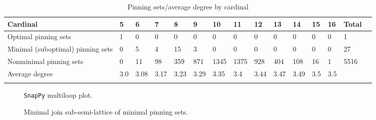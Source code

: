 \documentclass{article}%
\begin{document}
\begin{table}[ht]
	\caption{Pinning sets/average degree by cardinal}
	\centering
	\renewcommand{\arraystretch}{1.5}
	\begin{tabularx}{\textwidth}{lXXXXXXXXXXXXXX}
		\toprule
			Cardinal & 5 & 6 & 7 & 8 & 9 & 10 & 11 & 12 & 13 & 14 & 15 & 16 & Total\\
			\hline
			Optimal pinning sets & 1 & 0 & 0 & 0 & 0 & 0 & 0 & 0 & 0 & 0 & 0 & 0 & 1 \\
			Minimal (suboptimal) pinning sets & 0 & 5 & 4 & 15 & 3 & 0 & 0 & 0 & 0 & 0 & 0 & 0 & 27 \\
			Nonminimal pinning sets & 0 & 11 & 98 & 359 & 871 & 1345 & 1375 & 928 & 404 & 108 & 16 & 1 & 5516 \\
			Average degree & 3.0 & 3.08 & 3.17 & 3.23 & 3.29 & 3.35 & 3.4 & 3.44 & 3.47 & 3.49 & 3.5 & 3.5 &  \\
		\bottomrule \\ 
	\end{tabularx}
\end{table}

\begin{multicols}{2}
\begin{figure}[H]
\centering

\caption{\texttt{SnapPy} multiloop plot.}
\label{fig:tex/img/[[24, 28, 1, 25], [25, 11, 26, 12], [8, 23, 9, 24], [9, 27, 10, 28], [1, 10, 2, 11], [26, 2, 27, 3], [12, 3, 13, 4], [16, 7, 17, 8], [17, 22, 18, 23], [13, 18, 14, 19], [4, 19, 5, 20], [20, 15, 21, 16.svg}
\end{figure}
\columnbreak

\begin{figure}[H]
\centering
\scalebox{0.8}{}
\caption{Minimal join sub-semi-lattice of minimal pinning sets.}
\label{fig:tex/img/[[24, 28, 1, 25], [25, 11, 26, 12], [8, 23, 9, 24], [9, 27, 10, 28], [1, 10, 2, 11], [26, 2, 27, 3], [12, 3, 13, 4], [16, 7, 17, 8], [17, 22, 18, 23], [13, 18, 14, 19], [4, 19, 5, 20], [20, 15, 21, 16.pgf}
\end{figure}
\end{multicols}
\end{document}
